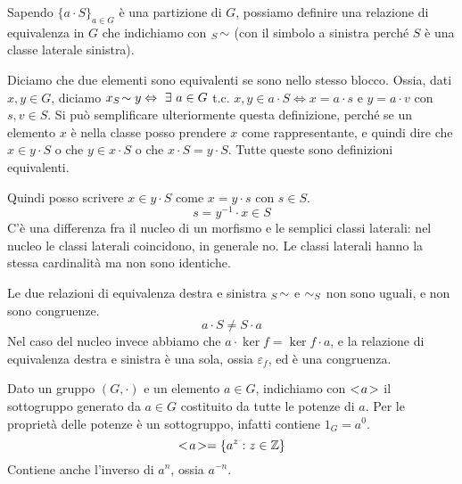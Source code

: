Sapendo $\{a \cdot S\}_{a \in G}$ \`e una partizione di $G$, possiamo definire una relazione di equivalenza in $G$ che indichiamo con ${}_{S}\!\sim$ (con il simbolo a sinistra perch\'e $S$ \`e una classe laterale sinistra).

Diciamo che due elementi sono equivalenti se sono nello stesso blocco. Ossia, dati $x, y \in G$, diciamo $x \lateralsx{S} y \iff \exists a \in G $ t.c. $ x, y \in a \cdot S \iff x = a \cdot s$ e $y = a \cdot v$ con $s, v \in S$. Si pu\`o semplificare ulteriormente questa definizione, perch\'e se un elemento $x$ \`e nella classe posso prendere $x$ come rappresentante, e quindi dire che $x \in y \cdot S$ o che $y \in x \cdot S$ o che $x \cdot S = y \cdot S$. Tutte queste sono definizioni equivalenti.

Quindi posso scrivere $x \in y \cdot S$ come $x = y \cdot s$ con $s \in S$.
\[
s = y^{-1} \cdot x \in S
\]
C'\`e una differenza fra il nucleo di un morfismo e le semplici classi laterali: nel nucleo le classi laterali coincidono, in generale no. Le classi laterali hanno la stessa cardinalit\`a ma non sono identiche.

Le due relazioni di equivalenza destra e sinistra ${}_{S}\!\sim$ e $\sim_{S}$ non sono uguali, e non sono congruenze.
\[
a \cdot S \neq S \cdot a
\]
Nel caso del nucleo invece abbiamo che $a \cdot \ker f = \ker f \cdot a$, e la relazione di equivalenza destra e sinistra \`e una sola, ossia $\varepsilon_f$, ed \`e una congruenza.

\begin{defn}
Dato un gruppo $(G, \cdot)$ e un elemento $a \in G$, indichiamo con $<\!{a}\!>$ il sottogruppo generato da $a \in G$ costituito da tutte le potenze di $a$. Per le propriet\`a delle potenze \`e un sottogruppo, infatti contiene $1_G = a^{0}$.
\[
<\!{a}\!> = \{ a^{z} : z \in \mathbb{Z} \}
\]
Contiene anche l'inverso di $a^{n}$, ossia $a^{-n}$.
\end{defn}

